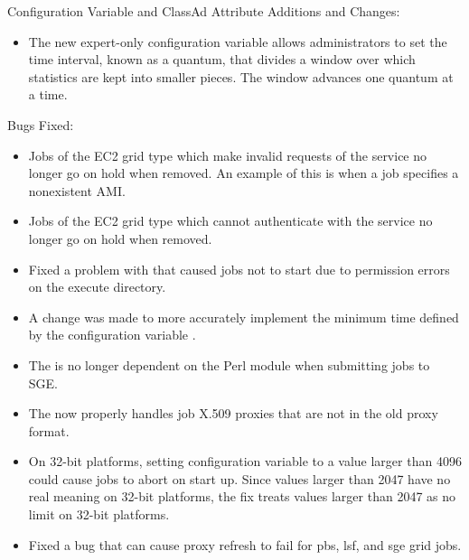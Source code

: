\noindent Configuration Variable and ClassAd Attribute Additions and Changes:

\begin{itemize}

\item The new expert-only configuration variable 
allows administrators to set the time interval, 
known as a quantum, that divides a window over which statistics are
kept into smaller pieces.  The window advances one quantum at a time. 


\end{itemize}

\noindent Bugs Fixed:

\begin{itemize}

\item Jobs of the EC2 grid type which make invalid requests of the
service no longer go on hold when removed.
An example of this is when a job specifies a nonexistent AMI. 

\item Jobs of the EC2 grid type which cannot authenticate with the
service no longer go on hold when removed.

\item Fixed a problem with  that caused jobs not to start 
due to permission errors on the execute directory.

\item A change was made to more accurately implement the
minimum time defined by the configuration variable
. 

\item The  is no longer dependent on the Perl module 
 when submitting jobs to SGE.

\item The  now properly handles job X.509 proxies that 
are not in the old proxy format.

\item On 32-bit platforms,
setting configuration variable  to a value 
larger than 4096 could cause jobs to abort on start up.
Since values larger than 2047 have no real meaning on 32-bit platforms,
the fix treats values larger than 2047 as no limit on 32-bit platforms.

\item Fixed a bug that can cause proxy refresh to fail for pbs, lsf,
and sge grid jobs.


\end{itemize}
